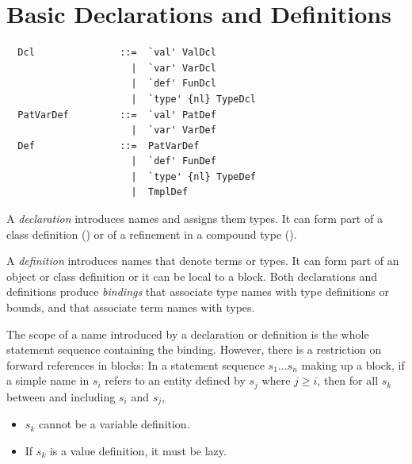 \chapter{Basic Declarations and Definitions}
\label{sec:defs}

\syntax\begin{lstlisting}
  Dcl               ::=  `val' ValDcl
                      |  `var' VarDcl
                      |  `def' FunDcl
                      |  `type' {nl} TypeDcl
  PatVarDef         ::=  `val' PatDef
                      |  `var' VarDef
  Def               ::=  PatVarDef
                      |  `def' FunDef
                      |  `type' {nl} TypeDef
                      |  TmplDef
\end{lstlisting}

A {\em declaration} introduces names and assigns them types. It can
form part of a class definition () or of a
refinement in a compound type ().

A {\em definition} introduces names that denote terms or types. It can
form part of an object or class definition or it can be local to a
block.  Both declarations and definitions produce {\em bindings} that
associate type names with type definitions or bounds, and that
associate term names with types.

The scope of a name introduced by a declaration or definition is the
whole statement sequence containing the binding.  However, there is a
restriction on forward references in blocks: In a statement sequence
$s_1 \ldots s_n$ making up a block, if a simple name in $s_i$ refers
to an entity defined by $s_j$ where $j \geq i$, then for all $s_k$
between and including $s_i$ and $s_j$,
\begin{itemize}
\item $s_k$ cannot be a variable definition.
\item If $s_k$ is a value definition, it must be lazy.
\end{itemize}

